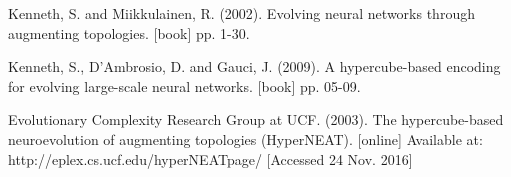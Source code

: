 \documentclass[12pt,a4paper]{article}
\begin{document}
\begin{thebibliography}{10}
	Kenneth, S. and Miikkulainen, R.
	(2002).
	Evolving neural networks through augmenting topologies.
	[book]
	pp. 1-30.
	
	Kenneth, S., D'Ambrosio, D. and Gauci, J.
	(2009).
	A hypercube-based encoding for evolving large-scale neural networks.
	[book]
	pp. 05-09.
	
	Evolutionary Complexity Research Group at UCF.
	(2003).
	The hypercube-based neuroevolution of augmenting topologies (HyperNEAT).
	[online]
	Available at: http://eplex.cs.ucf.edu/hyperNEATpage/
	[Accessed 24 Nov. 2016]
\end{thebibliography}
\end{document}

